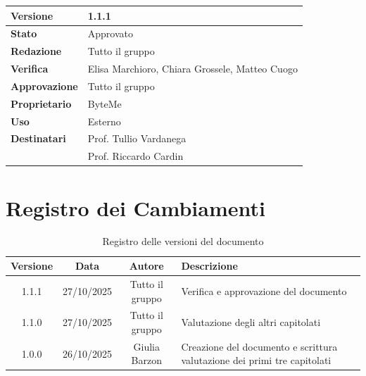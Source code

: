 \documentclass[11pt,a4paper]{article}
\begin{document}
\begin{titlepage}
    \begin{table}[H]
        \centering
        \begin{tabular}{|l|p{5cm}|}
            \hline
            \textbf{Versione} & 1.1.1 \\
            \hline
            \textbf{Stato} & Approvato \\
            \hline
            \textbf{Redazione} & Tutto il gruppo \\
            \hline
            \textbf{Verifica} & Elisa Marchioro, Chiara Grossele, Matteo Cuogo \\
            \hline
            \textbf{Approvazione} & Tutto il gruppo \\
            \hline
            \textbf{Proprietario} & ByteMe \\
            \hline
            \textbf{Uso} & Esterno \\
            \hline
            \textbf{Destinatari} & Prof. Tullio Vardanega \\ & Prof. Riccardo Cardin \\
            \hline
        \end{tabular}
    \end{table}
    
    \vfill
\end{titlepage}

\section*{Registro dei Cambiamenti}

\begin{table}[H]
    \centering
    \begin{tabular}{|c|c|c|>{\raggedright\arraybackslash}p{}|}
        \hline
        \textbf{Versione} & \textbf{Data} & \textbf{Autore} & \textbf{Descrizione} \\
        \hline
        1.1.1 & 27/10/2025 & Tutto il gruppo & Verifica e approvazione del documento \\
        \hline
        1.1.0 & 27/10/2025 & Tutto il gruppo & Valutazione degli altri capitolati \\
        \hline
        1.0.0 & 26/10/2025 & Giulia Barzon & Creazione del documento e scrittura valutazione dei primi tre capitolati \\
        \hline
    \end{tabular}
    \caption{Registro delle versioni del documento}
    \label{tab:versionamento}
\end{table}
\end{document}
